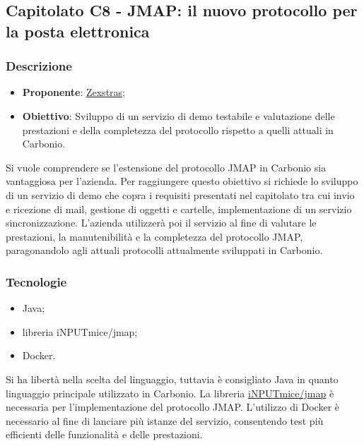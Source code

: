 \subsection{Capitolato C8 - JMAP: il nuovo protocollo per la posta elettronica}


\subsubsection{Descrizione}
\begin{itemize}
    \item \textbf{Proponente}: \href{https://zextras.com/it}{Zexstras};
    \item \textbf{Obiettivo}: Sviluppo di un servizio di demo testabile e valutazione delle prestazioni e della completezza del protocollo rispetto a quelli attuali in Carbonio.
\end{itemize}
Si vuole comprendere se l'estensione del protocollo JMAP in Carbonio sia vantaggiosa per l'azienda.
Per raggiungere questo obiettivo si richiede lo sviluppo di un servizio di demo che copra i requisiti presentati nel capitolato tra cui invio e ricezione di mail, gestione di oggetti e cartelle, implementazione di un servizio sincronizzazione.
L'azienda utilizzerà poi il servizio al fine di valutare le prestazioni, la manutenibilità e la completezza del protocollo JMAP, paragonandolo agli attuali protocolli attualmente sviluppati in Carbonio.

\subsubsection{Tecnologie}
\begin{itemize}
    \item Java;
    \item libreria iNPUTmice/jmap;
    \item Docker.
\end{itemize}
Si ha libertà nella scelta del linguaggio, tuttavia è consigliato Java in quanto linguaggio principale utilizzato in Carbonio.
La libreria \href{https://github.com/iNPUTmice/jmap}{iNPUTmice/jmap} è necessaria per l'implementazione del protocollo JMAP.
L'utilizzo di Docker è necessario al fine di lanciare più istanze del servizio,  consentendo test più efficienti delle funzionalità e delle prestazioni.

